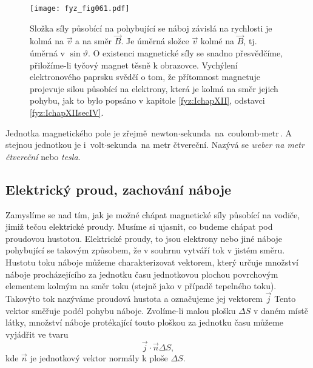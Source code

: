     \begin{figure}[ht!]  %
      \centering
      \texttt{[image: fyz\_fig061.pdf]}
      \caption{Složka síly působící na pohybující se náboj závislá na rychlosti je kolmá na 
               \(\vec{v}\) a na směr \(\vec{B}\). Je úměrná složce \(\vec{v}\) kolmé na 
               \(\vec{B}\), tj. úměrná v \(\sin\vartheta\). O existenci magnetické síly se snadno 
                přesvědčíme, přiložíme-li tyčový magnet těsně k obrazovce. Vychýlení elektronového 
                paprsku svědčí o tom, že přítomnost magnetuje projevuje silou působící na 
                elektrony, která je kolmá na směr jejich pohybu, jak to bylo popsáno v kapitole 
                \ref{fyz:IchapXII}, odstavci \ref{fyz:IchapXIIsecIV}.
                \cite[s.~225]{Feynman02}}
      \label{fyz:fig061}
    \end{figure}
    
    Jednotka magnetického pole je zřejmě \(\text{newton}\cdot\text{sekunda}\) na \(\text{coulomb} 
    \cdot \text{metr}\). A stejnou jednotkou je i \(\text{volt}\cdot\text{sekunda}\) na metr 
    čtvereční. Nazývá se \emph{weber na metr čtvereční} nebo \emph{tesla}.

    \subsection{Elektrický proud, zachování náboje}
      \cite[s.~225]{Feynman02} Zamyslíme se nad tím, jak je možné chápat magnetické síly působící 
      na vodiče, jimiž tečou elektrické proudy. Musíme si ujasnit, co budeme chápat pod proudovou 
      hustotou. Elektrické proudy, to jsou elektrony nebo jiné náboje pohybující se takovým 
      způsobem, že v souhrnu vytváří tok v jistém směru. Hustotu toku náboje můžeme charakterizovat 
      vektorem, který určuje množství náboje procházejícího za jednotku času jednotkovou plochou 
      povrchovým elementem kolmým na směr toku (stejně jako v případě tepelného toku). Takovýto tok 
      nazýváme proudová hustota a označujeme jej vektorem \(\vec{j}\) Tento vektor směřuje podél 
      pohybu náboje. Zvolíme-li malou plošku \(\Delta S\) v daném místě látky, množství náboje 
      protékající touto ploškou za jednotku času můžeme vyjádřit ve tvaru
      \begin{equation}\label{eq_fyz:mag001}
        \vec{j}\cdot\vec{n}\Delta S,
      \end{equation} 
      kde \(\vec{n}\) je jednotkový vektor normály k ploše \(\Delta S\).
      
